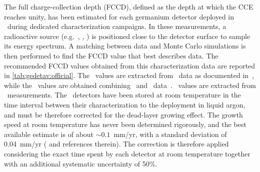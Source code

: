 The full charge-collection depth (FCCD), defined as the depth at which the CCE reaches
unity, has been estimated for each germanium detector deployed in \gerda\ during dedicated
characterization campaigns. In these measurements, a radioactive source (e.g.~\Am, \Ba,
\Co) is positioned close to the detector surface to sample its energy spectrum. A matching
between data and Monte Carlo simulations is then performed to find the FCCD value that
best describes data. The recommended FCCD values obtained from this characterization data
are reported in \cref{tab:gedetav:official}. The \scoax\ values are extracted from \Co\
data as documented in~\cite{Heider2009}, while the \bege\ values are obtained combining
\Am\ and \Ba\ data~\cite{Agostini2019}. \icoax\ values are extracted from \Am\
measurements. The \bege\ detectors have been stored at room temperature in the time
interval between their characterization to the deployment in liquid argon, and must be
therefore corrected for the dead-layer growing effect. The growth speed at room
temperature has never been determined rigorously, and the best available estimate is of
about $\sim{}0.1$~mm/yr, with a standard deviation of 0.04~mm/yr (\cite{Agostini2019} and
references therein). The correction is therefore applied considering the exact time spent
by each detector at room temperature together with an additional systematic uncertainty of
50\%.
\begin{table}
  \centering
  \caption{%
    Recommended full charge-collection depth (FCCD) and dead layer fraction (DLF) values
    for each detector deployed in \gerdatwo, calculated from detector characterization
    data. The \bege\ FCCD values are obtained combining \Am\ and \Ba\
    data~\cite{Agostini2019} while \scoax\ values are extracted from \Co\
    data~\cite{Heider2009}. The \icoax\ values are obtained from \Am\ data. The \bege\
    FCCDs are corrected for the dead-layer growing effect at room temperature experienced
    before installment in \gerda~\cite{Agostini2019}. The uncertainties are split into
    correlated and uncorrelated contributions. The DLF values have been estimated
    in~\cite{Lehnert2016} and do not include any growing effect at room temperature.
    \fillme{fill table}
  }\label{tab:gedetav:official}
  
\end{table}

